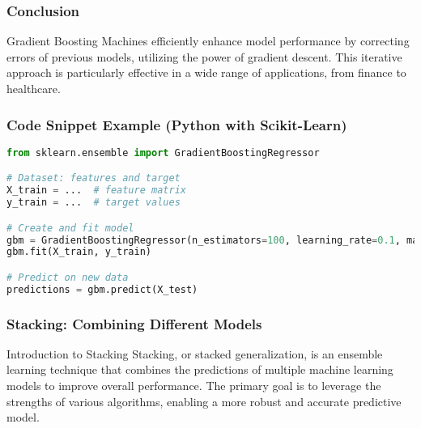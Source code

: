\documentclass[aspectratio=169]{beamer}
\begin{document}
\begin{frame}[fragile]
    \frametitle{Conclusion}
    Gradient Boosting Machines efficiently enhance model performance by correcting errors of previous models, utilizing the power of gradient descent. This iterative approach is particularly effective in a wide range of applications, from finance to healthcare.
\end{frame}

\begin{frame}[fragile]
    \frametitle{Code Snippet Example (Python with Scikit-Learn)}
    \begin{lstlisting}[language=Python]
from sklearn.ensemble import GradientBoostingRegressor

# Dataset: features and target
X_train = ...  # feature matrix
y_train = ...  # target values

# Create and fit model
gbm = GradientBoostingRegressor(n_estimators=100, learning_rate=0.1, max_depth=3)
gbm.fit(X_train, y_train)

# Predict on new data
predictions = gbm.predict(X_test)
    \end{lstlisting}
\end{frame}

\begin{frame}[fragile]
    \frametitle{Stacking: Combining Different Models}
    \begin{block}{Introduction to Stacking}
        Stacking, or stacked generalization, is an ensemble learning technique that combines 
        the predictions of multiple machine learning models to improve overall performance. 
        The primary goal is to leverage the strengths of various algorithms, enabling a 
        more robust and accurate predictive model.
    \end{block}
\end{frame}
\end{document}
